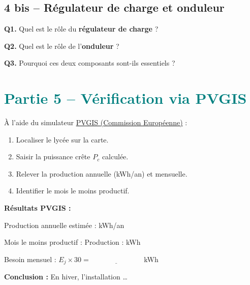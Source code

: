 \documentclass[a4paper, 11pt, oneside]{article}
\begin{document}
\vspace{0.8cm}

\subsection*{4 bis -- Régulateur de charge et onduleur}

\begin{tcolorbox}[colback=cyancol!10, colframe=cyancol]
\textbf{Q1.} Quel est le rôle du \textbf{régulateur de charge} ?

\vspace{1.2cm}

\textbf{Q2.} Quel est le rôle de l'\textbf{onduleur} ?

\vspace{1.2cm}

\textbf{Q3.} Pourquoi ces deux composants sont-ils essentiels ?

\vspace{1.2cm}
\end{tcolorbox}

\newpage

\section{\textcolor{teal}{Partie 5 -- Vérification via PVGIS}}

À l'aide du simulateur \href{https://re.jrc.ec.europa.eu/pvg_tools/fr/}{PVGIS (Commission Européenne)} :
\begin{enumerate}
  \item Localiser le lycée sur la carte.
  \item Saisir la puissance crête $P_c$ calculée.
  \item Relever la production annuelle (kWh/an) et mensuelle.
  \item Identifier le mois le moins productif.
\end{enumerate}

\vspace{0.6cm}

\begin{tcolorbox}[colback=vertcol!10, colframe=vertcol]
\textbf{Résultats PVGIS :}

\vspace{0.4cm}
Production annuelle estimée : \underline{\hspace{5cm}} kWh/an

\vspace{0.3cm}
Mois le moins productif : \underline{\hspace{2.5cm}} \quad Production : \underline{\hspace{2cm}} kWh

\vspace{0.3cm}
Besoin mensuel : $E_j \times 30 = \underline{\hspace{3cm}}$ kWh

\vspace{0.3cm}
\textbf{Conclusion :} En hiver, l'installation \ldots

\vspace{1.5cm}
\end{tcolorbox}
\end{document}
